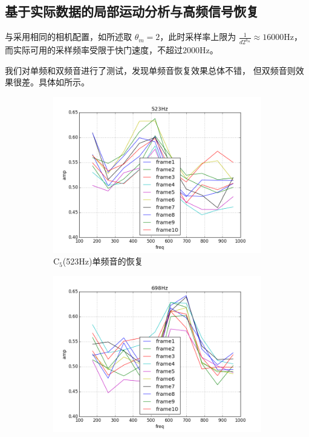 \subsection{基于实际数据的局部运动分析与高频信号恢复}
与采用相同的相机配置，如所述取
$\theta_m=2$，此时采样率上限为
$\frac{1}{d2^{\theta_m}} \approx 16000$Hz，
而实际可用的采样频率受限于快门速度，不超过$2000$Hz。

我们对单频和双频音进行了测试，发现单频音恢复效果总体不错，
但双频音则效果很差。具体如所示。
\begin{figure}[h!]\begin{center}
    \begin{subfigure}[b]{.33\figwidth}
        \includegraphics[width=.4\figwidth]{res/data-523.png}
        \caption{$\text{C}_5$(523Hz)单频音的恢复}
    \end{subfigure}
    \begin{subfigure}[b]{.33\figwidth}
        \includegraphics[width=.4\figwidth]{res/data-698.png}

\end{subfigure}
\end{center}
\end{figure}
